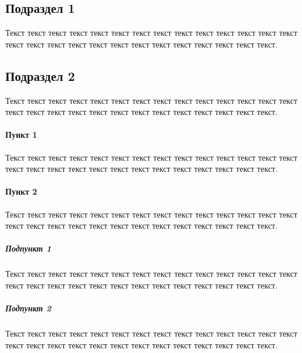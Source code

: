 \subsection{Подраздел 1}
Текст текст текст текст текст текст текст текст текст текст текст текст текст текст текст текст текст текст текст текст текст текст текст текст текст текст текст.

\subsection{Подраздел 2}
Текст текст текст текст текст текст текст текст текст текст текст текст текст текст текст текст текст текст текст текст текст текст текст текст текст текст текст.

\paragraph{Пункт 1} 
Текст текст текст текст текст текст текст текст текст текст текст текст текст текст текст текст текст текст текст текст текст текст текст текст текст текст текст.

\paragraph{Пункт 2} 
Текст текст текст текст текст текст текст текст текст текст текст текст текст текст текст текст текст текст текст текст текст текст текст текст текст текст текст.

\subparagraph{Подпункт 1} 
Текст текст текст текст текст текст текст текст текст текст текст текст текст текст текст текст текст текст текст текст текст текст текст текст текст текст текст.

\subparagraph{Подпункт 2} 
Текст текст текст текст текст текст текст текст текст текст текст текст текст текст текст текст текст текст текст текст текст текст текст текст текст текст текст.
